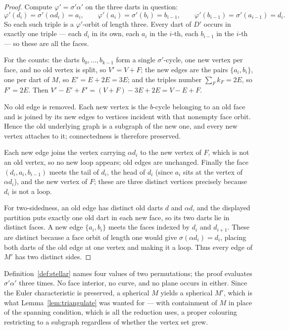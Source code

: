 \begin{proof}
Compute $\varphi' = \sigma'\alpha'$ on the three darts in question:
\[
  \varphi'(d_i) = \sigma'(\alpha d_i) = a_i, \qquad
  \varphi'(a_i) = \sigma'(b_i) = b_{i-1}, \qquad
  \varphi'(b_{i-1}) = \sigma'(a_{i-1}) = d_i .
\]
So each such triple is a $\varphi'$-orbit of length three. Every dart of $D'$
occurs in exactly one triple --- each $d_i$ in its own, each $a_i$ in the
$i$-th, each $b_{i-1}$ in the $i$-th --- so these are all the faces.

For the counts: the darts $b_0,\dots,b_{k-1}$ form a single $\sigma'$-cycle,
one new vertex per face, and no old vertex is split, so $V' = V + F$; the new
edges are the pairs $\{a_i,b_i\}$, one per dart of $M$, so
$E' = E + 2E = 3E$; and the triples number $\sum_F k_F = 2E$, so $F' = 2E$.
Then $V' - E' + F' = (V+F) - 3E + 2E = V - E + F$.

No old edge is removed.  Each new vertex is the $b$-cycle belonging to an old
face and is joined by its new edges to vertices incident with that nonempty
face orbit.  Hence the old underlying graph is a subgraph of the new one, and
every new vertex attaches to it; connectedness is therefore preserved.

Each new edge joins the vertex carrying $\alpha d_i$ to the new vertex of
$F$, which is not an old vertex, so no new loop appears; old edges are
unchanged. Finally the face $(d_i, a_i, b_{i-1})$ meets the tail of $d_i$,
the head of $d_i$ (since $a_i$ sits at the vertex of $\alpha d_i$), and the
new vertex of $F$; these are three distinct vertices precisely because $d_i$
is not a loop.

For two-sidedness, an old edge has distinct old darts $d$ and $\alpha d$, and
the displayed partition puts exactly one old dart in each new face, so its two
darts lie in distinct faces.  A new edge $\{a_i,b_i\}$ meets the faces indexed
by $d_i$ and $d_{i+1}$.  These are distinct because a face orbit of length one
would give $\sigma(\alpha d_i)=d_i$, placing both darts of the old edge at one
vertex and making it a loop.  Thus every edge of $M'$ has two distinct sides.
\end{proof}

\begin{remark}
\Sprose
Definition~\ref{def:stellar} names four values of two permutations; the proof
evaluates $\sigma'\alpha'$ three times. No face interior, no curve, and no
plane occurs in either. Since the Euler characteristic is preserved, a
spherical $M$ yields a spherical $M'$, which is what
Lemma~\ref{lem:triangulate} was wanted for --- with containment of $M$ in
place of the spanning condition, which is all the reduction uses, a proper
colouring restricting to a subgraph regardless of whether the vertex set
grew.
\end{remark}

